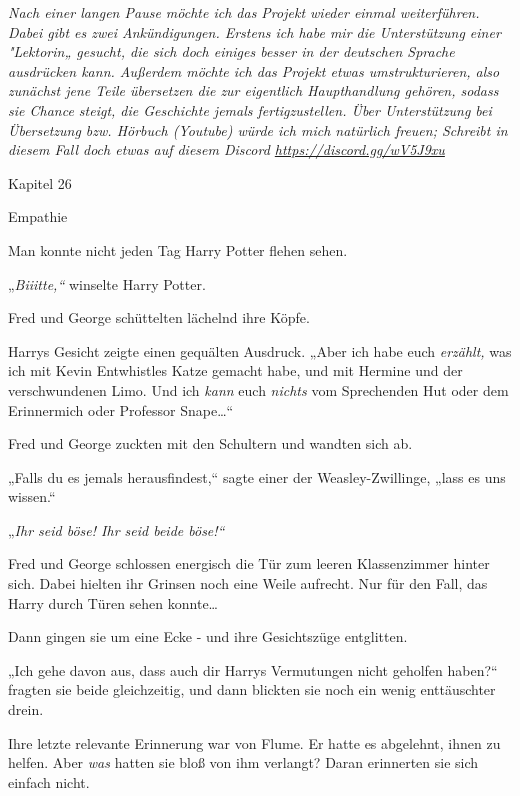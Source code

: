 

\hypertarget{empathie}{%

\emph{Nach einer langen Pause möchte ich das Projekt wieder einmal weiterführen. Dabei gibt es zwei Ankündigungen. Erstens ich habe mir die Unterstützung einer "Lektorin„ gesucht, die sich doch einiges besser in der deutschen Sprache ausdrücken kann. Außerdem möchte ich das Projekt etwas umstrukturieren, also zunächst jene Teile übersetzen die zur eigentlich Haupthandlung gehören, sodass sie Chance steigt, die Geschichte jemals fertigzustellen. Über Unterstützung bei Übersetzung bzw. Hörbuch (Youtube) würde ich mich natürlich freuen; Schreibt in diesem Fall doch etwas auf diesem Discord \url{https://discord.gg/wV5J9xu} ~}

Kapitel 26

Empathie

Man konnte nicht jeden Tag Harry Potter flehen sehen.

„\emph{Biiitte,“} winselte Harry Potter.

Fred und George schüttelten lächelnd ihre Köpfe.

Harrys Gesicht zeigte einen gequälten Ausdruck. „Aber ich habe euch \emph{erzählt,} was ich mit Kevin Entwhistles Katze gemacht habe, und mit Hermine und der verschwundenen Limo. Und ich \emph{kann} euch \emph{nichts} vom Sprechenden Hut oder dem Erinnermich oder Professor Snape…“

Fred und George zuckten mit den Schultern und wandten sich ab.

„Falls du es jemals herausfindest,“ sagte einer der Weasley-Zwillinge, „lass es uns wissen.“

„\emph{Ihr seid böse! Ihr seid beide böse!“}

Fred und George schlossen energisch die Tür zum leeren Klassenzimmer hinter sich. Dabei hielten ihr Grinsen noch eine Weile aufrecht. Nur für den Fall, das Harry durch Türen sehen konnte…

Dann gingen sie um eine Ecke - und ihre Gesichtszüge entglitten.

„Ich gehe davon aus, dass auch dir Harrys Vermutungen \later nicht geholfen haben?“ fragten sie beide gleichzeitig, und dann blickten sie noch ein wenig enttäuschter drein.

Ihre letzte relevante Erinnerung war von Flume. Er hatte es abgelehnt, ihnen zu helfen. Aber \emph{was} hatten sie bloß von ihm verlangt? Daran erinnerten sie sich einfach nicht.

}
